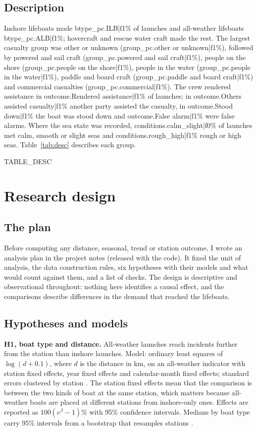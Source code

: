 \documentclass[11pt,a4paper]{article}
\begin{document}
\subsection{Description}
Inshore lifeboats made {{btype_pc.ILB|f1}}\% of launches and all-weather lifeboats {{btype_pc.ALB|f1}}\%; hovercraft and rescue water craft made the rest. The largest casualty group was other or unknown ({{group_pc.other or unknown|f1}}\%), followed by powered and sail craft ({{group_pc.powered and sail craft|f1}}\%), people on the shore ({{group_pc.people on the shore|f1}}\%), people in the water ({{group_pc.people in the water|f1}}\%), paddle and board craft ({{group_pc.paddle and board craft|f1}}\%) and commercial casualties ({{group_pc.commercial|f1}}\%). The crew rendered assistance in {{outcome.Rendered assistance|f1}}\% of launches; in {{outcome.Others assisted casualty|f1}}\% another party assisted the casualty, in {{outcome.Stood down|f1}}\% the boat was stood down and {{outcome.False alarm|f1}}\% were false alarms. Where the sea state was recorded, {{conditions.calm_slight|f0}}\% of launches met calm, smooth or slight seas and {{conditions.rough_high|f1}}\% rough or high seas. Table~\ref{tab:desc} describes each group.

{{TABLE_DESC}}

\section{Research design}\label{sec:design}
\subsection{The plan}
Before computing any distance, seasonal, trend or station outcome, I wrote an analysis plan in the project notes (released with the code). It fixed the unit of analysis, the data construction rules, six hypotheses with their models and what would count against them, and a list of checks. The design is descriptive and observational throughout: nothing here identifies a causal effect, and the comparisons describe differences in the demand that reached the lifeboats.

\subsection{Hypotheses and models}
\textbf{H1, boat type and distance.} All-weather launches reach incidents further from the station than inshore launches. Model: ordinary least squares of $\log(d + 0.1)$, where $d$ is the distance in km, on an all-weather indicator with station fixed effects, year fixed effects and calendar-month fixed effects; standard errors clustered by station \citep{cameron2015,abadie2023}. The station fixed effects mean that the comparison is between the two kinds of boat at the same station, which matters because all-weather boats are placed at different stations from inshore-only ones. Effects are reported as $100(e^{\beta} - 1)\%$ with 95\% confidence intervals. Medians by boat type carry 95\% intervals from a bootstrap that resamples stations \citep{efron1993}.
\end{document}
